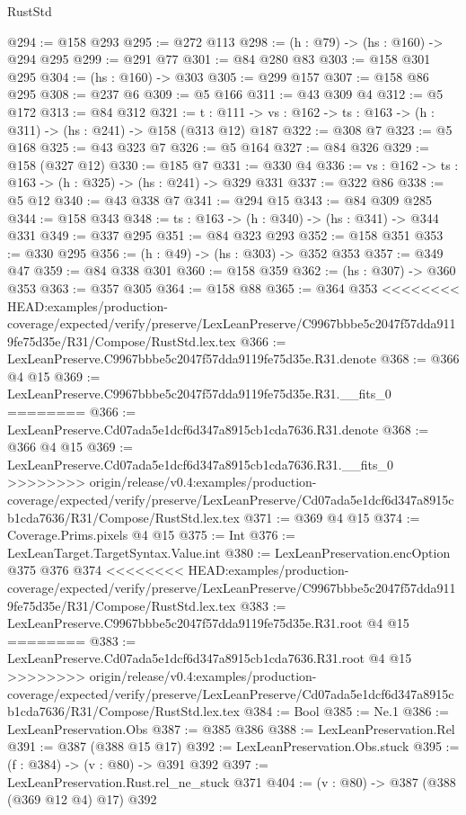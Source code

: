 \begin{lexlean}{RustStd}
\begin{coremodule}
{\begin{coremodule}
@294 := @158 @293
@295 := @272 @113
@298 := (h : @79) -> (hs : @160) -> @294 @295
@299 := @291 @77
@301 := @84 @280 @83
@303 := @158 @301 @295
@304 := (hs : @160) -> @303
@305 := @299 @157
@307 := @158 @86 @295
@308 := @237 @6
@309 := @5 @166
@311 := @43 @309 @4
@312 := @5 @172
@313 := @84 @312
@321 := {t : @111} ->
  {vs : @162} -> {ts : @163} -> (h : @311) -> (hs : @241) -> @158 (@313 @12) @187
@322 := @308 @7
@323 := @5 @168
@325 := @43 @323 @7
@326 := @5 @164
@327 := @84 @326
@329 := @158 (@327 @12)
@330 := @185 @7
@331 := @330 @4
@336 := {vs : @162} -> {ts : @163} -> (h : @325) -> (hs : @241) -> @329 @331
@337 := @322 @86
@338 := @5 @12
@340 := @43 @338 @7
@341 := @294 @15
@343 := @84 @309 @285
@344 := @158 @343
@348 := {ts : @163} -> (h : @340) -> (hs : @341) -> @344 @331
@349 := @337 @295
@351 := @84 @323 @293
@352 := @158 @351
@353 := @330 @295
@356 := (h : @49) -> (hs : @303) -> @352 @353
@357 := @349 @47
@359 := @84 @338 @301
@360 := @158 @359
@362 := (hs : @307) -> @360 @353
@363 := @357 @305
@364 := @158 @88
@365 := @364 @353
<<<<<<<< HEAD:examples/production-coverage/expected/verify/preserve/LexLeanPreserve/C9967bbbe5c2047f57dda9119fe75d35e/R31/Compose/RustStd.lex.tex
@366 := LexLeanPreserve.C9967bbbe5c2047f57dda9119fe75d35e.R31.denote
@368 := @366 @4 @15
@369 := LexLeanPreserve.C9967bbbe5c2047f57dda9119fe75d35e.R31.__fits_0
========
@366 := LexLeanPreserve.Cd07ada5e1dcf6d347a8915cb1cda7636.R31.denote
@368 := @366 @4 @15
@369 := LexLeanPreserve.Cd07ada5e1dcf6d347a8915cb1cda7636.R31.__fits_0
>>>>>>>> origin/release/v0.4:examples/production-coverage/expected/verify/preserve/LexLeanPreserve/Cd07ada5e1dcf6d347a8915cb1cda7636/R31/Compose/RustStd.lex.tex
@371 := @369 @4 @15
@374 := Coverage.Prims.pixels @4 @15
@375 := Int
@376 := LexLeanTarget.TargetSyntax.Value.int
@380 := LexLeanPreservation.encOption @375 @376 @374
<<<<<<<< HEAD:examples/production-coverage/expected/verify/preserve/LexLeanPreserve/C9967bbbe5c2047f57dda9119fe75d35e/R31/Compose/RustStd.lex.tex
@383 := LexLeanPreserve.C9967bbbe5c2047f57dda9119fe75d35e.R31.root @4 @15
========
@383 := LexLeanPreserve.Cd07ada5e1dcf6d347a8915cb1cda7636.R31.root @4 @15
>>>>>>>> origin/release/v0.4:examples/production-coverage/expected/verify/preserve/LexLeanPreserve/Cd07ada5e1dcf6d347a8915cb1cda7636/R31/Compose/RustStd.lex.tex
@384 := Bool
@385 := Ne.{1}
@386 := LexLeanPreservation.Obs
@387 := @385 @386
@388 := LexLeanPreservation.Rel
@391 := @387 (@388 @15 @17)
@392 := LexLeanPreservation.Obs.stuck
@395 := (f : @384) -> (v : @80) -> @391 @392
@397 := LexLeanPreservation.Rust.rel_ne_stuck @371
@404 := (v : @80) -> @387 (@388 (@369 @12 @4) @17) @392

\end{coremodule}}
\end{coremodule}
\end{lexlean}
